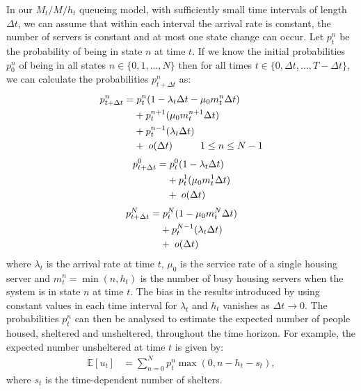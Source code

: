 \documentclass[12pt,a4paper]{article}
\begin{document}
In our $M_t/M/h_t$ queueing model, with sufficiently small time intervals of length $\Delta t$, we can assume that within each interval the arrival rate is constant, the number of servers is constant and at most one state change can occur. Let $p^{n}_{t}$ be the probability of being in state $n$ at time $t$. If we know the initial probabilities $p^{n}_{0}$ of being in all states $n \in \{0,1,...,N\}$ then for all times $t \in \{0, \Delta t,...,T-\Delta t\}$, we can calculate the probabilities $p^{n}_{t + \Delta t}$ as: 
% 
\begin{align*}
  p^n_{t+\Delta t} = & \hspace{0.1cm} p^{n}_{t}(1-\lambda_t\Delta t-\mu_0 m^n_t \Delta t) \\
                    & + p^{n+1}_{t}(\mu_0 m^{n+1}_t \Delta t) \\
                    & + p^{n-1}_t(\lambda_t \Delta t) \\
                    & + \hspace{0.1cm} o(\Delta t) \hspace{1cm} 1 \leq n \leq N-1
\end{align*}
% 
\begin{align*}
  p^0_{t+\Delta t} = & \hspace{0.1cm} p^{0}_{t}(1-\lambda_t\Delta t) \\
                    & + p^{1}_t(\mu_0 m^{1}_t \Delta t) \\
                    & + \hspace{0.1cm} o(\Delta t)
\end{align*}
% 
\begin{align*}
  p^N_{t+\Delta t} = & \hspace{0.1cm} p^{N}_{t}(1-\mu_0 m^N_t \Delta t) \\
                    & + p^{N-1}_t(\lambda_t \Delta t) \\
                    & + \hspace{0.1cm} o(\Delta t)
\end{align*}
% 
where $\lambda_t$ is the arrival rate at time $t$, $\mu_0$ is the service rate of a single housing server and $m^n_t = \min(n,h_t)$ is the number of busy housing servers when the system is in state $n$ at time $t$. The bias in the results introduced by using constant values in each time interval for $\lambda_t$ and $h_t$ vanishes as $\Delta t \to 0$. The probabilities $p^n_t$ can then be analysed to estimate the expected number of people housed, sheltered and unsheltered, throughout the time horizon. For example, the expected number unsheltered at time $t$ is given by:
%
\begin{align} \label{u_t_mmt}
\mathbb{E}[u_t] & = \sum_{n=0}^{N} p^n_t \max(0,n-h_t-s_t), 
\end{align}
%
where $s_t$ is the time-dependent number of shelters.
\end{document}
